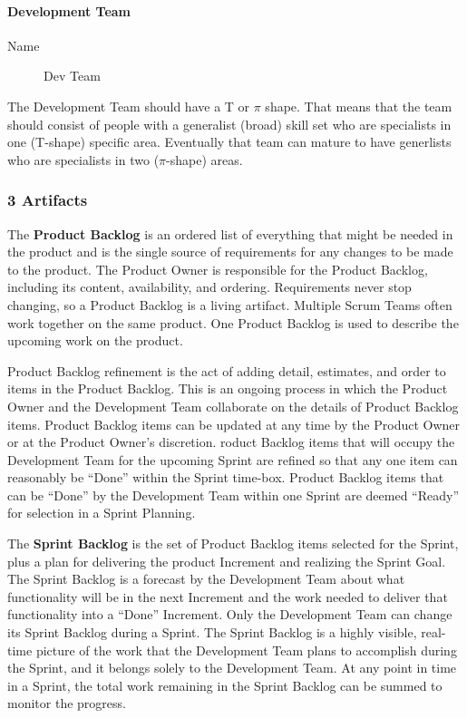 \paragraph{Development Team}
\begin{description}
   \item [Name] Dev Team
\end{description}
The Development Team should have a T \cite{wiki:tshaped} or $\pi$ shape. That means that the team should consist of people with a generalist (broad) skill set who are specialists in one (T-shape) specific area. Eventually that team can mature to have generlists who are specialists in two ($\pi$-shape) areas.

\subsubsection{3 Artifacts}

The \textbf{Product Backlog} is an ordered list of everything that might be needed in the product and is the single source of requirements for any changes to be made to the product. The Product Owner is responsible for the Product Backlog, including its content, availability, and ordering. Requirements never stop changing, so a Product Backlog is a living artifact. Multiple Scrum Teams often work together on the same product. One Product Backlog is used to describe the upcoming work on the product.

Product Backlog refinement is the act of adding detail, estimates, and order to items in the Product Backlog. This is an ongoing process in which the Product Owner and the Development Team collaborate on the details of Product Backlog items. Product Backlog items can be updated at any time by the Product Owner or at the Product Owner’s discretion. roduct Backlog items that will occupy the Development Team for the upcoming Sprint are refined so that any one item can reasonably be “Done” within the Sprint time-box. Product Backlog items that can be “Done” by the Development Team within one Sprint are deemed “Ready” for selection in a Sprint Planning.\newline

The \textbf{Sprint Backlog} is the set of Product Backlog items selected for the Sprint, plus a plan for delivering the product Increment and realizing the Sprint Goal. The Sprint Backlog is a forecast by the Development Team about what functionality will be in the next Increment and the work needed to deliver that functionality into a “Done” Increment. Only the Development Team can change its Sprint Backlog during a Sprint. The Sprint Backlog is a highly visible, real-time picture of the work that the Development Team plans to accomplish during the Sprint, and it belongs solely to the Development Team. At any point in time in a Sprint, the total work remaining in the Sprint Backlog can be summed to monitor the progress.\newline

